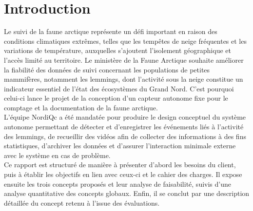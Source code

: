 \chapter{Introduction}
\label{s:intro}

Le suivi de la faune arctique représente un défi important en raison des
conditions climatiques extrêmes, telles que les tempêtes de neige fréquentes et
les variations de température, auxquelles s’ajoutent l’isolement géographique
et l’accès limité au territoire. Le ministère de la Faune Arctique souhaite
améliorer la fiabilité des données de suivi concernant les populations de
petites mammifères, notamment les lemmings, dont l’activité sous la neige
constitue un indicateur essentiel de l’état des écosystèmes du Grand Nord.
C’est pourquoi celui-ci lance le projet de la conception d’un capteur autonome
fixe pour le comptage et la documentation de la faune arctique. \\

L’équipe NordiQc a été mandatée pour produire le design conceptuel du système
autonome permettant de détecter et d’enregistrer les événements liés à
l’activité des lemmings, de recueillir des vidéos afin de collecter des
informations à des fins statistiques, d’archiver les données et d’assurer
l’interaction minimale externe avec le système en cas de problème. \\

Ce rapport est structuré de manière à présenter d’abord les besoins du client,
puis à établir les objectifs en lien avec ceux-ci et le cahier des charges. Il
expose ensuite les trois concepts proposés et leur analyse de faisabilité,
suivis d’une analyse quantitative des concepts globaux. Enfin, il se conclut
par une description détaillée du concept retenu à l’issue des évaluations.
